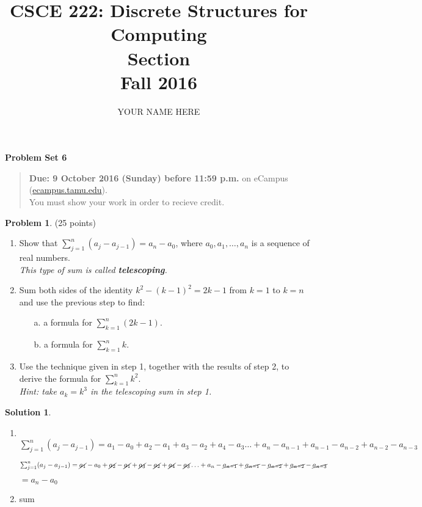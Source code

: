 \documentclass{article}
\title{CSCE 222: Discrete Structures for Computing\\Section \mysectionnumber\\Fall 2016}
\author{YOUR NAME HERE}
\theoremstyle{definition}
\newtheorem{problem}{Problem}
\newtheorem*{solution}{Solution}
\newcommand{\problemset}[1]{\begin{center}\textbf{Problem Set #1}\end{center}}
\newcommand{\duedate}[1]{\begin{quote}\textbf{Due: #1} on eCampus (\url{ecampus.tamu.edu}). \\You must show your work in order to recieve credit.\end{quote}}
\begin{document}
\maketitle

\problemset{6}

\duedate{9 October 2016 (Sunday) before 11:59 p.m.}

\bigskip

\begin{problem} (25 points)
\begin{enumerate}
\item Show that $ \sum_{j=1}^n (a_j-a_{j-1})=a_n-a_0$, where $a_0,a_1,\ldots,a_n$ is a sequence of real numbers.\\ \textit{This type of sum is called \textbf{telescoping}.}
\item Sum both sides of the identity $k^2-(k-1)^2=2k-1$ from $k=1$ to $k=n$ and use the previous step to find:
\begin{enumerate}
\item[a.] a formula for $ \sum_{k=1}^n (2k-1)$.
\item[b.] a formula for $ \sum_{k=1}^n k$.
\end{enumerate}
\item Use the technique given in step 1, together with the results of step 2, to derive the formula for $\displaystyle \sum_{k=1}^n k^2$.\\
\textit{Hint: take $a_k=k^3$ in the telescoping sum in step 1.}
\end{enumerate}
\end{problem}

\begin{solution}\ \\
  \begin{enumerate}
    \item \ \\
     $\sum_{j=1}^n (a_j-a_{j-1})=a_1-a_0 + a_2-a_1 + a_3-a_2 + a_4-a_3\ldots + a_n - a_{n-1} + a_{n-1} - a_{n-2} + a_{n-2} - a_{n-3}$


     $\sum_{j=1}^n (a_j-a_{j-1})=\cancel{a_1}-a_0 + \cancel{a_2}-\cancel{a_1} + \cancel{a_3}-\cancel{a_2} + \cancel{a_4}-\cancel{a_3}\ldots + a_n - \cancel{a_{n-1}} + \cancel{a_{n-1}} - \cancel{a_{n-2}} + \cancel{a_{n-2}} - \cancel{a_{n-3}}$


     $= a_n-a_0$

     \item sum



  \end{enumerate}
\end{solution}
\end{document}
